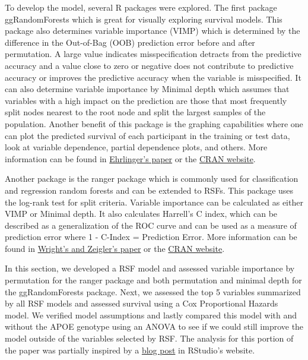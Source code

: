 \documentclass[a4paper,man,natbib,11pt]{article}
\begin{document}
To develop the model, several R packages were explored. The first package ggRandomForests which is great for visually exploring survival models. This package also determines variable importance (VIMP) which is determined by the difference in the Out-of-Bag (OOB) prediction error before and after permutation. A large value indicates misspecification detracts from the predictive accuracy and a value close to zero or negative does not contribute to predictive accuracy or improves the predictive accuracy when the variable is misspecified. It can also determine variable importance by Minimal depth which assumes that variables with a high impact on the prediction are those that most frequently split nodes nearest to the root node and split the largest samples of the population. Another benefit of this package is the graphing capabilities where one can plot the predicted survival of each participant in the training or test data, look at variable dependence, partial dependence plots, and others. More information can be found in \href{https://arxiv.org/pdf/1612.08974.pdf}{Ehrlinger's paper} or the \href{https://cran.r-project.org/web/packages/ggRandomForests/index.html}{CRAN website}.

Another package is the ranger package which is commonly used for classification and regression random forests and can be extended to RSFs. This package uses the log-rank test for split criteria. Variable importance can be calculated as either VIMP or Minimal depth. It also calculates Harrell's C index, which can be described as a generalization of the ROC curve and can be used as a measure of prediction error where 1 - C-Index = Prediction Error. More information can be found in \href{https://arxiv.org/pdf/1508.04409.pdf}{Wright's and Zeigler's paper} or the \href{https://cran.r-project.org/web/packages/ranger/index.html}{CRAN website}.

In this section, we developed a RSF model and assessed variable importance by permutation for the ranger package and both permutation and minimal depth for the ggRandomForests package. Next, we assessed the top 5 variables summarized by all RSF models and assessed survival using a Cox Proportional Hazards model. We verified model assumptions and lastly compared this model with and without the APOE genotype using an ANOVA to see if we could still improve the model outside of the variables selected by RSF. The analysis for this portion of the paper was partially inspired by a \href{https://rviews.rstudio.com/2017/09/25/survival-analysis-with-r/}{blog post} in RStudio's website.
\end{document}
